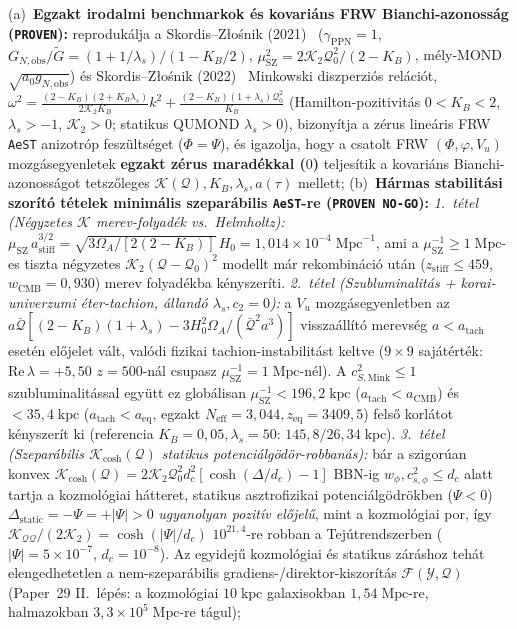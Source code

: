 \documentclass[11pt,a4paper]{article}
\begin{document}
\begin{enumerate}
    (a)~\textbf{Egzakt irodalmi benchmarkok és kovariáns FRW Bianchi-azonosság (\texttt{PROVEN}):} reprodukálja a Skordis--Z{\l}o\'snik (2021)~\cite{SkordisZlosnik2021} ($\gamma_{\mathrm{PPN}}=1$, $G_{N,\mathrm{obs}}/\tilde{G} = (1+1/\lambda_s)/(1-K_B/2)$, $\mu_{\mathrm{SZ}}^2 = 2\mathcal{K}_2\mathcal{Q}_0^2/(2-K_B)$, mély-MOND $\sqrt{a_0 g_{N,\mathrm{obs}}}$) és Skordis--Z{\l}o\'snik (2022)~\cite{SkordisZlosnik2022} Minkowski diszperziós relációt, $\omega^2 = \frac{(2-K_B)(2+K_B\lambda_s)}{2\mathcal{K}_2 K_B}k^2 + \frac{(2-K_B)(1+\lambda_s)\mathcal{Q}_0^2}{K_B}$ (Hamilton-pozitivitás $0 < K_B < 2$, $\lambda_s > -1$, $\mathcal{K}_2 > 0$; statikus QUMOND $\lambda_s > 0$), bizonyítja a zérus lineáris FRW \texttt{AeST} anizotróp feszültséget ($\Phi = \Psi$), és igazolja, hogy a csatolt FRW $(\Phi, \varphi, V_u)$ mozgásegyenletek \textbf{egzakt zérus maradékkal ($0$)} teljesítik a kovariáns Bianchi-azonosságot tetszőleges $\mathcal{K}(\mathcal{Q}), K_B, \lambda_s, a(\tau)$ mellett;
    (b)~\textbf{Hármas stabilitási szorító tételek minimális szeparábilis \texttt{AeST}-re (\texttt{PROVEN NO-GO}):}
    \emph{1.~tétel (Négyzetes $\mathcal{K}$ merev-folyadék vs.\ Helmholtz):} $\mu_{\mathrm{SZ}}\,a_{\mathrm{stiff}}^{3/2} = \sqrt{3\Omega_A/[2(2-K_B)]}\,H_0 = 1{,}014\times 10^{-4}\;\mathrm{Mpc}^{-1}$, ami a $\mu_{\mathrm{SZ}}^{-1} \ge 1\;\mathrm{Mpc}$-es tiszta négyzetes $\mathcal{K}_2(\mathcal{Q}-\mathcal{Q}_0)^2$ modellt már rekombináció után ($z_{\mathrm{stiff}} \le 459$, $w_{\mathrm{CMB}}=0{,}930$) merev folyadékba kényszeríti.
    \emph{2.~tétel (Szubluminalitás + korai-univerzumi éter-tachion, állandó $\lambda_s, c_2=0$):} a $V_u$ mozgásegyenletben az $a\bar{\mathcal{Q}}[(2-K_B)(1+\lambda_s) - 3H_0^2\Omega_A/(\bar{\mathcal{Q}}^2 a^3)]$ visszaállító merevség $a < a_{\mathrm{tach}}$ esetén előjelet vált, valódi fizikai tachion-instabilitást keltve ($9\times 9$ sajátérték: $\mathrm{Re}\,\lambda = +5{,}50$ $z=500$-nál csupasz $\mu_{\mathrm{SZ}}^{-1} = 1\;\mathrm{Mpc}$-nél). A $c_{S,\mathrm{Mink}}^2 \le 1$ szubluminalitással együtt ez globálisan $\mu_{\mathrm{SZ}}^{-1} < 196{,}2\;\mathrm{kpc}$ ($a_{\mathrm{tach}} < a_{\mathrm{CMB}}$) és $< 35{,}4\;\mathrm{kpc}$ ($a_{\mathrm{tach}} < a_{\mathrm{eq}}$, egzakt $N_{\mathrm{eff}}=3{,}044, z_{\mathrm{eq}}=3409{,}5$) felső korlátot kényszerít ki (referencia $K_B=0{,}05, \lambda_s=50$: $145{,}8 / 26{,}34\;\mathrm{kpc}$).
    \emph{3.~tétel (Szeparábilis $\mathcal{K}_{\cosh}(\mathcal{Q})$ statikus potenciálgödör-robbanás):} bár a szigorúan konvex $\mathcal{K}_{\cosh}(\mathcal{Q}) = 2\mathcal{K}_2\mathcal{Q}_0^2 d_c^2[\cosh(\Delta/d_c)-1]$ BBN-ig $w_\phi, c_{s,\phi}^2 \le d_c$ alatt tartja a kozmológiai hátteret, statikus asztrofizikai potenciálgödrökben ($\Psi < 0$) $\Delta_{\mathrm{static}} = -\Psi = +|\Psi| > 0$ \emph{ugyanolyan pozitív előjelű}, mint a kozmológiai por, így $\mathcal{K}_{\mathcal{Q}\mathcal{Q}}/(2\mathcal{K}_2) = \cosh(|\Psi|/d_c)$ $10^{21{,}4}$-re robban a Tejútrendszerben ($|\Psi|=5\times 10^{-7}$, $d_c = 10^{-8}$). Az egyidejű kozmológiai és statikus záráshoz tehát elengedhetetlen a nem-szeparábilis gradiens-/direktor-kiszorítás $\mathcal{F}(\mathcal{Y},\mathcal{Q})$ (Paper~29 II.~lépés: a kozmológiai $10\;\mathrm{kpc}$ galaxisokban $1{,}54\;\mathrm{Mpc}$-re, halmazokban $3{,}3\times 10^5\;\mathrm{Mpc}$-re tágul);

\end{enumerate}
\end{document}
